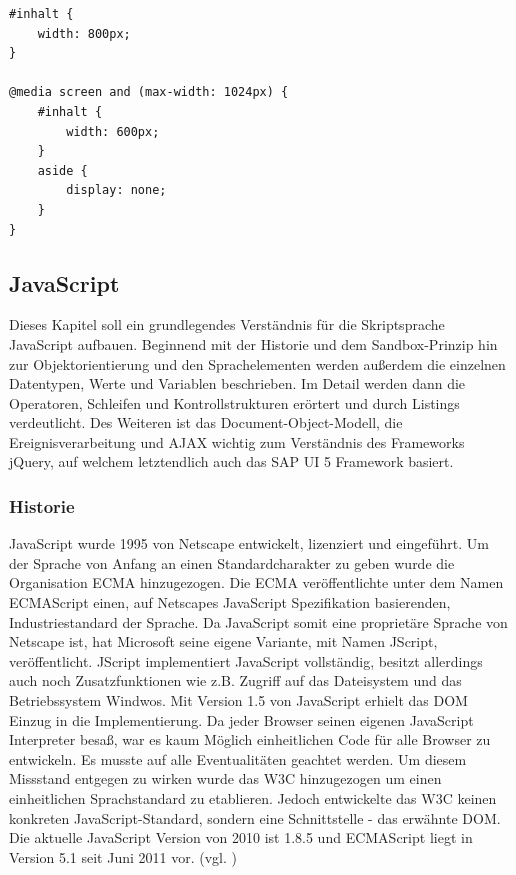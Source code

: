 	\vspace{1em}
	\begin{lstlisting}[frame=htrbl, caption=CSS3 eigenschaftsspezifisches Stylesheet, label=lst:css3mediaquery]
#inhalt {
	width: 800px;
}
 
@media screen and (max-width: 1024px) {
	#inhalt {
		width: 600px;
	}
	aside {
		display: none;
	}
}
	\end{lstlisting}

\subsection{JavaScript}
Dieses Kapitel soll ein grundlegendes Verständnis für die Skriptsprache JavaScript aufbauen. Beginnend mit der Historie und dem Sandbox-Prinzip hin zur Objektorientierung und den Sprachelementen werden außerdem die einzelnen Datentypen, Werte und Variablen beschrieben. Im Detail werden dann die Operatoren, Schleifen und Kontrollstrukturen erörtert und durch Listings verdeutlicht. Des Weiteren ist das Document-Object-Modell, die Ereignisverarbeitung und AJAX wichtig zum Verständnis des Frameworks jQuery, auf welchem letztendlich auch das SAP UI 5 Framework basiert.

\subsubsection{Historie} JavaScript wurde 1995 von Netscape entwickelt, lizenziert und eingeführt. Um der Sprache von Anfang an einen Standardcharakter zu geben wurde die Organisation ECMA hinzugezogen. Die ECMA veröffentlichte unter dem Namen ECMAScript einen, auf Netscapes JavaScript Spezifikation basierenden, Industriestandard der Sprache. Da JavaScript somit eine proprietäre Sprache von Netscape ist, hat Microsoft seine eigene Variante, mit Namen JScript, veröffentlicht. JScript implementiert JavaScript vollständig, besitzt allerdings auch noch Zusatzfunktionen wie z.B. Zugriff auf das Dateisystem und das Betriebssystem Windwos. Mit Version 1.5 von JavaScript erhielt das DOM Einzug in die Implementierung. Da jeder Browser seinen eigenen JavaScript Interpreter besaß, war es kaum Möglich einheitlichen Code für alle Browser zu entwickeln. Es musste auf alle Eventualitäten geachtet werden. Um diesem Missstand entgegen zu wirken wurde das W3C hinzugezogen um einen einheitlichen Sprachstandard zu etablieren. Jedoch entwickelte das W3C keinen konkreten JavaScript-Standard, sondern eine Schnittstelle - das erwähnte DOM. Die aktuelle JavaScript Version von 2010 ist 1.8.5 und ECMAScript liegt in Version 5.1 seit Juni 2011 vor. (vgl. \cite{SelfHtml20146})

